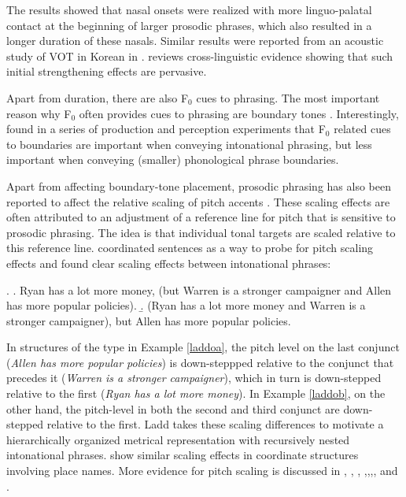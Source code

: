 \documentclass[preprint,review,12pt,authoryear,times]{elsarticle}
\begin{document}
\noindent The results showed that nasal onsets were realized with more linguo-palatal contact at the beginning of larger prosodic phrases, which also resulted in a longer duration of these nasals. Similar results were reported from an acoustic study of VOT in Korean in \citet{Jun93}.  \citet{keati03} reviews cross-linguistic evidence showing that such initial strengthening effects are pervasive.

Apart from duration, there are also F$_0$ cues to phrasing. The most important reason why F$_0$ often provides cues to phrasing are boundary tones \citep[][i.a.]{pierr80,ladd08}. Interestingly, \citet{gollr13} found in a series of production and perception experiments that F$_0$ related cues to boundaries are important when conveying intonational phrasing, but less important when conveying (smaller) phonological phrase boundaries. 

Apart from affecting boundary-tone placement, prosodic phrasing has also been reported to affect the relative scaling of pitch accents \citep{ladd88}. These scaling effects are  often attributed to an adjustment of a reference line for pitch that is sensitive to prosodic phrasing. The idea is that individual tonal targets are scaled relative to this reference line. \citet{ladd88} coordinated sentences as a way to probe for pitch scaling effects and found clear scaling effects between intonational phrases:

\ex.\label{laddoo}
\a. Ryan has a lot more money, (but Warren is a stronger campaigner and Allen has more popular policies).\label{laddoa}
\b. (Ryan has a lot more money and Warren is a stronger campaigner), but Allen has more popular policies.\label{laddob}

\noindent In structures of the type in Example \ref{laddoa},  the pitch level on the last conjunct ({\em Allen has more popular policies}) is down-steppped relative to the conjunct that precedes it ({\em Warren is a stronger campaigner}), which in turn is down-stepped relative to the first ({\em Ryan has a lot more money}). In Example  \ref{laddob}, on the other hand, the pitch-level in both the second and third conjunct are down-stepped relative to the first. Ladd takes these scaling differences to motivate  a hierarchically organized metrical representation with recursively nested intonational phrases.  \citet{vanden92} show similar  scaling effects in coordinate structures involving place names. More evidence for pitch scaling is discussed in \citet{Kuboz89}, \citet{Kuboz92}, \citet{vanden92}, \citet{fery05},\citet{fery10b},\citet{kentn13},\citet{truck15}, and \citet{petro17}.
\end{document}
